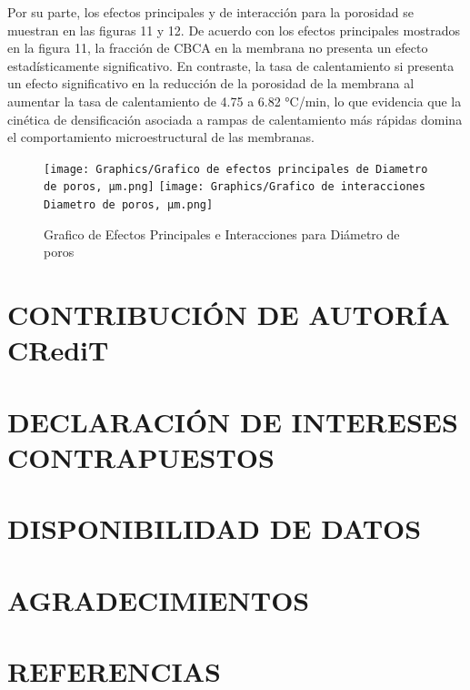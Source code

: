 \documentclass{article}
\begin{document}
Por su parte, los efectos principales y de interacción para la porosidad se muestran en las figuras 11 y 12. 
De acuerdo con los efectos principales mostrados en la figura 11, la fracción de CBCA en la membrana no presenta un efecto estadísticamente significativo. En contraste, la tasa de calentamiento si presenta un efecto significativo en la reducción de la porosidad de la membrana al aumentar la tasa de calentamiento de 4.75 a 6.82 °C/min, lo que evidencia que la cinética de densificación asociada a rampas de calentamiento más rápidas domina el comportamiento microestructural de las membranas. 

\begin{figure}
    \centering
    \texttt{[image: Graphics/Grafico de efectos principales de Diametro de poros, μm.png]}
    \texttt{[image: Graphics/Grafico de interacciones Diametro de poros, μm.png]}
    \caption{Grafico de Efectos Principales e Interacciones para Diámetro de poros}
    \label{fig:EfectosPrinDiametroPoros}
\end{figure}

\newpage
\section{CONTRIBUCIÓN DE AUTORÍA CRediT}

\section{DECLARACIÓN DE INTERESES CONTRAPUESTOS}

\section{DISPONIBILIDAD DE DATOS}

\section{AGRADECIMIENTOS}

\section{REFERENCIAS}

\printbibliography
\end{document}
